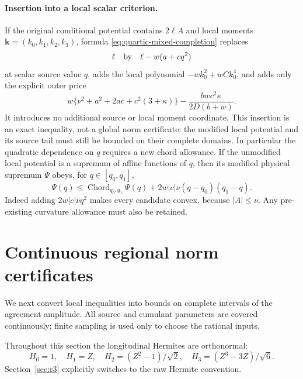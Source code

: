\documentclass[11pt]{article}
\begin{document}
\paragraph{Insertion into a local scalar criterion.}
If the original conditional potential contains $2\ell A$ and local
moments $\mathbf k=(k_0,k_1,k_2,k_3)$, formula
\eqref{eq:quartic-mixed-completion} replaces
\[
 \ell\quad\hbox{by}\quad\ell-w(a+cq^2)
\]
at scalar source value $q$, adds the local polynomial
$-wk_0^2+wCk_0^4$, and adds only the explicit outer price
\[
 w\{\nu^2+a^2+2ac+c^2(3+\kappa)\}
 -\frac{bw c^2\kappa}{2D(b+w)}.
\]
It introduces no additional source or local moment coordinate.
This insertion is an exact inequality, not a global norm certificate:
the modified local potential and its source tail must still be bounded
on their complete domains.  In particular the quadratic dependence
on $q$ requires a new chord allowance.  If the unmodified local
potential is a supremum of affine functions of $q$, then its modified
physical supremum $\Psi$ obeys, for $q\in[q_0,q_1]$,
\[
 \Psi(q)\leq\operatorname{Chord}_{q_0,q_1}\Psi(q)
       +2w|c|\nu(q-q_0)(q_1-q).
\]
Indeed adding $2w|c|\nu q^2$ makes every candidate convex, because
$|A|\leq\nu$.  Any pre-existing curvature allowance must also be retained.

\section{Continuous regional norm certificates}\label{sec:regional}
We next convert local inequalities into bounds on complete intervals of
the agreement amplitude. All source and cumulant parameters are covered
continuously; finite sampling is used only to choose the rational inputs.

Throughout this section the longitudinal Hermites are orthonormal:
\[
 H_0=1,\quad H_1=Z,\quad H_2=(Z^2-1)/\sqrt2,\quad
 H_3=(Z^3-3Z)/\sqrt6.
\]
Section~\ref{sec:r3} explicitly switches to the raw Hermite convention.
\end{document}
